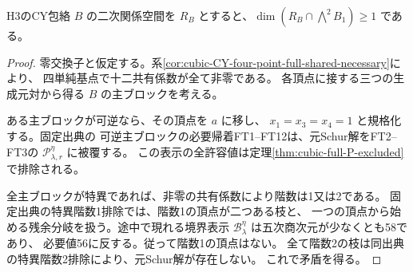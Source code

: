 \begin{theorem}\label{thm:cubic-CY-zero-commutator-empty}
H3のCY包絡 $B$ の二次関係空間を $R_B$ とすると、$\dim(R_B\cap\bigwedge^2 B_1)\ge1$ である。
\end{theorem}
\begin{proof}
零交換子と仮定する。系\ref{cor:cubic-CY-four-point-full-shared-necessary}により、
四単純基点で十二共有係数が全て非零である。
各頂点に接する三つの生成元対から得る $B$ の主ブロックを考える。

ある主ブロックが可逆なら、その頂点を $a$ に移し、
$x_1=x_3=x_4=1$ と規格化する。固定出典\cite{AS4CYpinned}の
可逆主ブロックの必要帰着FT1--FT12は、元Schur解をFT2--FT3の
$\mathcal P^\eta_{\lambda,r}$ に被覆する。
この表示の全許容値は定理\ref{thm:cubic-full-P-excluded}で排除される。

全主ブロックが特異であれば、非零の共有係数により階数は1又は2である。
固定出典の特異階数1排除では、階数1の頂点が二つある枝と、
一つの頂点から始める残余分岐を扱う。途中で現れる境界表示
$\mathcal B^\eta_\lambda$ は五次商次元が少なくとも58であり、
必要値56に反する。従って階数1の頂点はない。
全て階数2の枝は同出典の特異階数2排除により、元Schur解が存在しない。
これで矛盾を得る。
\end{proof}
